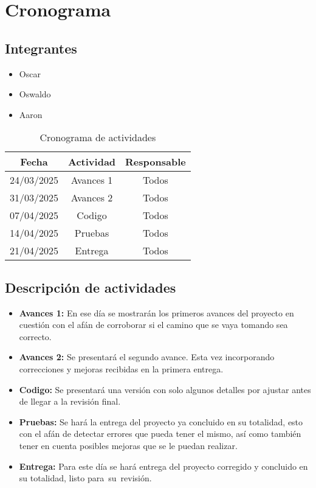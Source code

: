 \section*{Cronograma}

\subsection*{Integrantes}
\begin{itemize}
    \item Oscar
    \item Oswaldo
    \item Aaron
\end{itemize}

    \begin{table}[h]
        \begin{center}
            \begin{tabular}{| c | c  | c |}
                \hline
                Fecha & Actividad & Responsable 
                \\
                \hline
                24/03/2025 & Avances 1 & Todos
                \\
                \hline
                31/03/2025 & Avances 2 & Todos 
                \\
                \hline
                07/04/2025 & Codigo & Todos 
                \\
                \hline
                14/04/2025 & Pruebas & Todos 
                \\
                \hline
                21/04/2025 & Entrega & Todos 
                \\
                \hline
            \end{tabular}
        \caption{Cronograma de actividades}
        \end{center}
    \end{table}
\subsection*{Descripción de actividades}

\begin{itemize}
    \item \textbf{Avances 1:} En ese día se mostrarán los primeros avances del proyecto en cuestión con el afán de corroborar si el camino que se vaya tomando sea correcto.
    \item \textbf{Avances 2:} Se presentará el segundo avance. Esta vez incorporando correcciones y mejoras recibidas en la primera entrega.
    \item \textbf{Codigo:} Se presentará una versión con solo algunos detalles por ajustar antes de llegar a la revisión final.
    \item \textbf{Pruebas:} Se hará la entrega del proyecto ya concluido en su totalidad, esto con el afán de detectar errores que pueda tener el mismo, así como también tener en cuenta posibles mejoras que se le puedan realizar.
    \item \textbf{Entrega:} Para este día se hará entrega del proyecto corregido y concluido en su totalidad, listo para su revisión.
\end{itemize}
